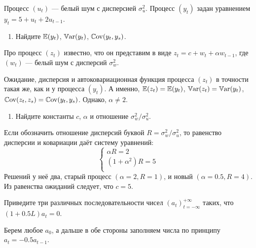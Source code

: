 \begin{problem}
Процесс $(u_t)$ — белый шум с дисперсией $\sigma^2_u$. 
Процесс $(y_t)$ задан уравнением  $y_t = 5 + u_t + 2u_{t-1}$.

\begin{enumerate}
  \item Найдите $\operatorname{\mathbb{E}}(y_t)$, $\operatorname{\mathbb{V}\mathrm{ar}}(y_t)$, $\operatorname{\mathbb{C}\mathrm{ov}}(y_t, y_s)$.
\end{enumerate}

Про процесс $(z_t)$ известно, что он представим в виде 
$z_t = c + w_t + \alpha w_{t-1}$, где $(w_t)$ — белый шум с дисперсий $\sigma^2_w$.

Ожидание, дисперсия и автоковариационная функция процесса $(z_t)$ в точности такая же, 
как и у процесса $(y_t)$. А именно, $\operatorname{\mathbb{E}}(z_t) = \operatorname{\mathbb{E}}(y_t)$, $\operatorname{\mathbb{V}\mathrm{ar}}(z_t) = \operatorname{\mathbb{V}\mathrm{ar}}(y_t)$,
$\operatorname{\mathbb{C}\mathrm{ov}}(z_t, z_s) = \operatorname{\mathbb{C}\mathrm{ov}}(y_t, y_s)$. Однако, $\alpha \neq 2$.

\begin{enumerate}[resume]
  \item Найдите константы $c$, $\alpha$ и отношение $\sigma^2_w/\sigma^2_u$.
\end{enumerate}
  
  \begin{sol}
Если обозначить отношение дисперсий буквой $R = \sigma^2_w/\sigma^2_u$,
то равенство дисперсии и ковариации даёт систему уравнений: 
\[
  \begin{cases}
    \alpha R = 2 \\
    (1+\alpha^2)R = 5 \\
  \end{cases}
\]
Решений у неё два, старый процесс $(\alpha=2, R=1)$, и новый $(\alpha=0.5, R=4)$.
Из равенства ожиданий следует, что $c=5$.
  \end{sol}
\end{problem}


\begin{problem}
Приведите три различных последовательности чисел $(a_t)_{t=-\infty}^{+\infty}$ таких, 
что $(1+0.5L)a_t = 0$.

  \begin{sol}
    Берем любое $a_0$, а дальше в обе стороны заполняем числа по принципу $a_t = -0.5 a_{t-1}$.
  \end{sol}
\end{problem}


